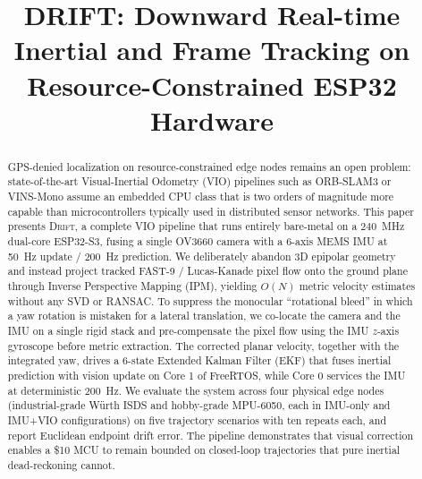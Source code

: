 \documentclass[conference]{IEEEtran}
\begin{document}
\title{DRIFT: Downward Real-time Inertial and Frame Tracking on
	Resource-Constrained ESP32 Hardware}

\author{
}

\maketitle

\begin{abstract}
GPS-denied localization on resource-constrained edge nodes remains an
open problem: state-of-the-art Visual-Inertial Odometry (VIO) pipelines
such as ORB-SLAM3 or VINS-Mono assume an embedded CPU class that is
two orders of magnitude more capable than microcontrollers
typically used in distributed sensor networks. This paper presents
\textsc{Drift}, a complete VIO pipeline that runs entirely bare-metal
on a 240~MHz dual-core ESP32-S3, fusing a single OV3660 camera with a
6-axis MEMS IMU at 50~Hz update / 200~Hz prediction.  We deliberately
abandon 3D epipolar geometry and instead project tracked
FAST-9 / Lucas-Kanade pixel flow onto the ground plane through
Inverse Perspective Mapping (IPM), yielding $O(N)$ metric velocity
estimates without any SVD or RANSAC.  To suppress the monocular
``rotational bleed'' in which a yaw rotation is mistaken for a lateral
translation, we co-locate the camera and the IMU on a single rigid
stack and pre-compensate the pixel flow using the IMU $z$-axis
gyroscope before metric extraction.  The corrected planar velocity,
together with the integrated yaw, drives a 6-state Extended Kalman
Filter (EKF) that fuses inertial prediction with vision update on
Core 1 of FreeRTOS, while Core 0 services the IMU at deterministic
200~Hz.  We evaluate the system across four physical edge nodes
(industrial-grade W\"urth ISDS and hobby-grade MPU-6050, each in
\mbox{IMU-only} and IMU+VIO configurations) on five trajectory
scenarios with ten repeats each, and report Euclidean endpoint drift
error.  The pipeline demonstrates that visual correction enables a
\$10 MCU to remain bounded on closed-loop trajectories that pure
inertial dead-reckoning cannot.
\end{abstract}
\end{document}
